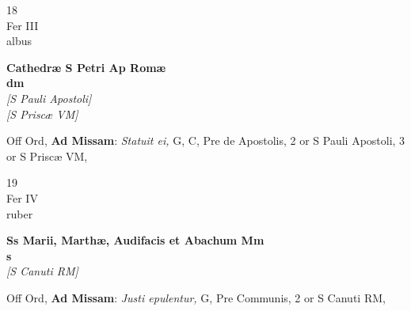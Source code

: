 \documentclass[10pt, openany]{book}
\begin{document}
        \begin{center}
            \begin{minipage}{3.5in}
                \vspace{2em}
                \begin{minipage}{0.5in}
                    {\Huge 18} \\
                    {\normalsize Fer III} \\
                    {\normalsize albus}
                \end{minipage}
                \begin{minipage}{3.0in}
                    \textbf{ \large Cathedræ S Petri Ap Romæ \\
                    \textnormal{\normalsize dm}} \\ \textit{[S Pauli Apostoli]} \\ \textit{[S Priscæ VM]} \\ 
                \end{minipage}
                \begin{justify}Off Ord, \textbf{Ad Missam}: \textit{Statuit ei,} G, C, Pre de Apostolis, 2 or S Pauli Apostoli, 3 or S Priscæ VM,   
                \end{justify}
            \end{minipage}
        \end{center}
    
        \begin{center}
            \begin{minipage}{3.5in}
                \vspace{2em}
                \begin{minipage}{0.5in}
                    {\Huge 19} \\
                    {\normalsize Fer IV} \\
                    {\normalsize ruber}
                \end{minipage}
                \begin{minipage}{3.0in}
                    \textbf{ \large Ss Marii, Marthæ, Audifacis et Abachum Mm \\
                    \textnormal{\normalsize s}} \\ \textit{[S Canuti RM]} \\ 
                \end{minipage}
                \begin{justify}Off Ord, \textbf{Ad Missam}: \textit{Justi epulentur,} G, Pre Communis, 2 or S Canuti RM,   
                \end{justify}
            \end{minipage}
        \end{center}
    
\end{document}
